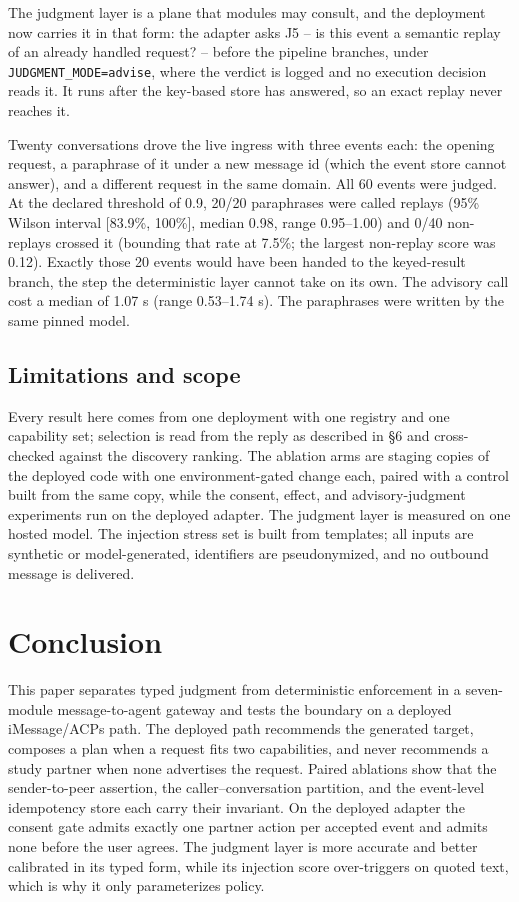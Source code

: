 \documentclass[runningheads,a4paper]{llncs}
\begin{document}
The judgment layer is a plane that modules may consult, and the deployment now carries it in that form: the adapter asks J5 -- is this event a semantic replay of an already handled request? -- before the pipeline branches, under \texttt{JUDGMENT\_\allowbreak{}MODE=advise}, where the verdict is logged and no execution decision reads it. It runs after the key-based store has answered, so an exact replay never reaches it.

Twenty conversations drove the live ingress with three events each: the opening request, a paraphrase of it under a new message id (which the event store cannot answer), and a different request in the same domain. All 60 events were judged. At the declared threshold of 0.9, 20/20 paraphrases were called replays (95\% Wilson interval [83.9\%, 100\%], median 0.98, range 0.95--1.00) and 0/40 non-replays crossed it (bounding that rate at 7.5\%; the largest non-replay score was 0.12). Exactly those 20 events would have been handed to the keyed-result branch, the step the deterministic layer cannot take on its own. The advisory call cost a median of 1.07 s (range 0.53--1.74 s). The paraphrases were written by the same pinned model.

\subsection{Limitations and scope}

Every result here comes from one deployment with one registry and one capability set; selection is read from the reply as described in §6 and cross-checked against the discovery ranking. The ablation arms are staging copies of the deployed code with one environment-gated change each, paired with a control built from the same copy, while the consent, effect, and advisory-judgment experiments run on the deployed adapter. The judgment layer is measured on one hosted model. The injection stress set is built from templates; all inputs are synthetic or model-generated, identifiers are pseudonymized, and no outbound message is delivered.

\section{Conclusion}

This paper separates typed judgment from deterministic enforcement in a seven-module message-to-agent gateway and tests the boundary on a deployed iMessage/ACPs path. The deployed path recommends the generated target, composes a plan when a request fits two capabilities, and never recommends a study partner when none advertises the request. Paired ablations show that the sender-to-peer assertion, the caller--conversation partition, and the event-level idempotency store each carry their invariant. On the deployed adapter the consent gate admits exactly one partner action per accepted event and admits none before the user agrees. The judgment layer is more accurate and better calibrated in its typed form, while its injection score over-triggers on quoted text, which is why it only parameterizes policy.
\end{document}
